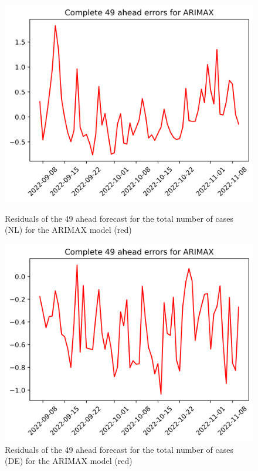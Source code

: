 \begin{figure}

\begin{minipage}{.45\textwidth}
  \centering
  \includegraphics[width=\linewidth]{pics/49_ah/49_ahead_errors_ARIMAX.png}
  \caption{Residuals of the 49 ahead forecast for the total number of cases (NL) for the ARIMAX model (red)}
  \label{fig:tot_cases_error_49_ARIMAX}
\end{minipage}
\begin{minipage}{.45\textwidth}
  \centering
  \includegraphics[width=\linewidth]{pics/49_ah/DE_49_ahead_errors_ARIMAX.png}
  \caption{Residuals of the 49 ahead forecast for the total number of cases (DE) for the ARIMAX model (red)}
  \label{fig:tot_cases_error_49_ARIMAX_DE}
\end{minipage}

\end{figure}
